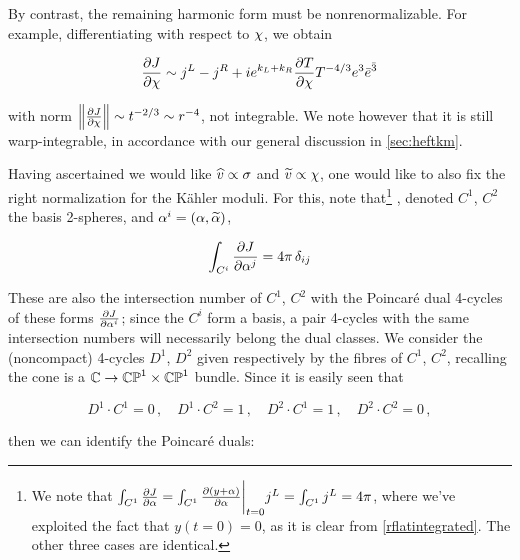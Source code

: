 By contrast, the remaining harmonic form must be nonrenormalizable. For example, differentiating with respect to $\chi$, we obtain

\begin{equation}
	\frac{\partial J}{\partial \chi} \sim j^L - j^R + ie^{k_L + k_R} \frac{\partial T}{\partial \chi} T^{-4/3} e^3 \bar e^{\bar 3}
	\label{}
\end{equation}

with norm $ \left\Vert \frac{\partial J}{\partial\chi} \right\Vert \sim t^{-2/3} \sim r^{-4}$, not integrable. We note however that it is still warp-integrable, in accordance with our general discussion in \ref{sec:heftkm}.

Having ascertained we would like $\widehat{v} \propto \sigma$ and $\widetilde{v} \propto \chi$, one would like to also fix the right normalization for the K\"ahler moduli. For this, note that\footnote{We note that $	\int_{C^1} \frac{\partial J}{\partial\alpha} = \int_{C^1} \frac{\partial(y + \alpha)}{\partial\alpha}\bigg|_{t=0} j^L  = \int_{C^1} j^L = 4\pi
	$, where we've exploited the fact that $y(t=0) = 0$, as it is clear from \eqref{rflatintegrated}. The other three cases are identical.} 
, denoted $C^1$, $C^2$ the basis 2-spheres, and $\alpha^i = (\alpha,\widetilde{\alpha})$,

\begin{equation}
	\int_{C^i} \frac{\partial J}{\partial\alpha^j} = 4\pi\, \delta_{ij}
	\label{}
\end{equation}


These are also the intersection number of $C^1$, $C^2$ with the Poincar\'e dual 4-cycles of these forms $\frac{\partial J}{\partial\alpha^i}$; since the $C^i$ form a basis, a pair 4-cycles with the same intersection numbers will necessarily belong the dual classes. We consider the (noncompact) 4-cycles $D^1$, $D^2$ given respectively by the fibres of $C^1$, $C^2$, recalling the cone is a $\mathbb{C}\rightarrow \mathbb{CP}^1 \times \mathbb{CP}^1$ bundle. Since it is easily seen that

\begin{equation}
	D^1 \cdot C^1 = 0\,,\quad D^1 \cdot C^2 = 1 \,, \quad D^2 \cdot C^1 = 1 \,, \quad D^2 \cdot C^2 = 0\,,
\end{equation}

then we can identify the Poincar\'e duals:


